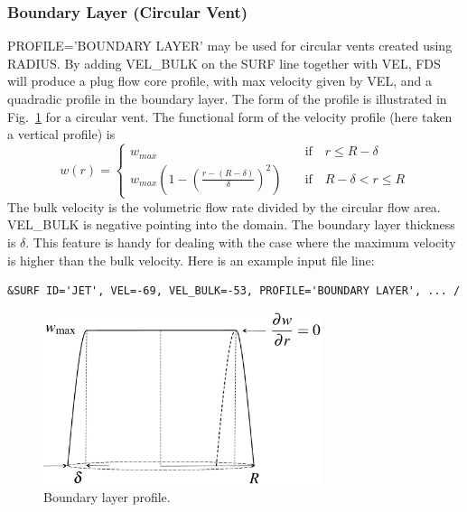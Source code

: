 \documentclass[11pt]{book}
\begin{document}
\subsubsection{Boundary Layer (Circular Vent)}

{\ct PROFILE='BOUNDARY LAYER'} may be used for circular vents created using {\ct RADIUS}. By adding {\ct VEL\_BULK} on the {\ct SURF} line together with {\ct VEL}, FDS will produce a plug flow core profile, with max velocity given by {\ct VEL}, and a quadradic profile in the boundary layer.  The form of the profile is illustrated in Fig.~\ref{fig:bl_profile} for a circular vent.  The functional form of the velocity profile (here taken a vertical profile) is
\begin{equation}
w(r) = \left\{ \begin{array}{ll} w_{\si{max}} & \quad \mbox{if} \quad r \le R-\delta \\ w_{\si{max}}\left(1 - \left(\frac{r-(R-\delta)}{\delta}\right)^2\right) & \quad \mbox{if} \quad R-\delta < r \le R \end{array} \right.
\end{equation}
The bulk velocity is the volumetric flow rate divided by the circular flow area.  {\ct VEL\_BULK} is negative pointing into the domain.  The boundary layer thickness is $\delta$.  This feature is handy for dealing with the case where the maximum velocity is higher than the bulk velocity.  Here is an example input file line:
\begin{lstlisting}
&SURF ID='JET', VEL=-69, VEL_BULK=-53, PROFILE='BOUNDARY LAYER', ... /
\end{lstlisting}

\begin{figure}[ht]
\begin{center}
\includegraphics[width=3.2in]{FIGURES/bl_profile}
\caption[Boundary layer profile]{Boundary layer profile.}
\label{fig:bl_profile}
\end{center}
\end{figure}
\end{document}
